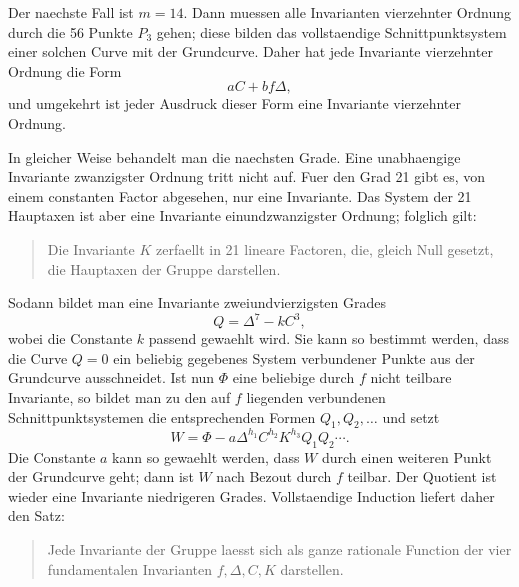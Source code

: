 \documentclass[11pt]{article}
\begin{document}
Der naechste Fall ist \(m=14\). Dann muessen alle Invarianten vierzehnter Ordnung durch die 56 Punkte \(P_3\) gehen; diese bilden das vollstaendige Schnittpunktsystem einer solchen Curve mit der Grundcurve. Daher hat jede Invariante vierzehnter Ordnung die Form
\begin{equation}
aC+bf\Delta,
\end{equation}
und umgekehrt ist jeder Ausdruck dieser Form eine Invariante vierzehnter Ordnung.

In gleicher Weise behandelt man die naechsten Grade. Eine unabhaengige Invariante zwanzigster Ordnung tritt nicht auf. Fuer den Grad 21 gibt es, von einem constanten Factor abgesehen, nur eine Invariante. Das System der 21 Hauptaxen ist aber eine Invariante einundzwanzigster Ordnung; folglich gilt:
\begin{quote}
Die Invariante \(K\) zerfaellt in 21 lineare Factoren, die, gleich Null gesetzt, die Hauptaxen der Gruppe darstellen.
\end{quote}

Sodann bildet man eine Invariante zweiundvierzigsten Grades
\begin{equation}
Q=\Delta^7-kC^3,
\tag{2}
\end{equation}
wobei die Constante \(k\) passend gewaehlt wird. Sie kann so bestimmt werden, dass die Curve \(Q=0\) ein beliebig gegebenes System verbundener Punkte aus der Grundcurve ausschneidet. Ist nun \(\Phi\) eine beliebige durch \(f\) nicht teilbare Invariante, so bildet man zu den auf \(f\) liegenden verbundenen Schnittpunktsystemen die entsprechenden Formen \(Q_1,Q_2,\ldots\) und setzt
\begin{equation}
W=\Phi-a\Delta^{h_1}C^{h_2}K^{h_3}Q_1Q_2\cdots.
\end{equation}
Die Constante \(a\) kann so gewaehlt werden, dass \(W\) durch einen weiteren Punkt der Grundcurve geht; dann ist \(W\) nach Bezout durch \(f\) teilbar. Der Quotient ist wieder eine Invariante niedrigeren Grades. Vollstaendige Induction liefert daher den Satz:
\begin{quote}
Jede Invariante der Gruppe laesst sich als ganze rationale Function der vier fundamentalen Invarianten \(f,\Delta,C,K\) darstellen.
\end{quote}
\end{document}
